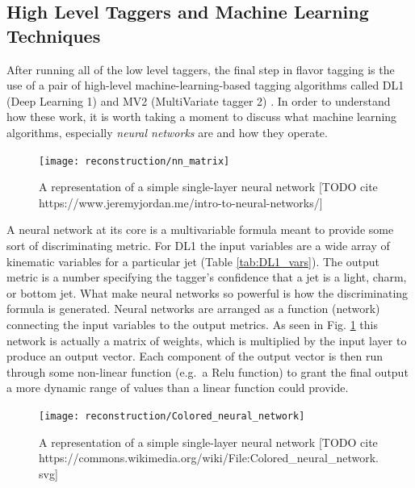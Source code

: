         \FloatBarrier
        \subsection{High Level Taggers and Machine Learning Techniques}\label{sec:ml_techniques}

            After running all of the low level taggers,
                the final step in flavor tagging is the use of a pair of high-level machine-learning-based tagging algorithms
                called DL1 (Deep Learning 1) and MV2 (MultiVariate tagger 2)
                \cite{bjet_id_and_performance} \cite{btagging_optimisation}.
            In order to understand how these work, it is worth taking a moment to discuss what machine learning algorithms,
                especially \textit{neural networks} are and how they operate.

            \begin{figure}[tbh] \center
                \texttt{[image: reconstruction/nn\_matrix]}
                \caption{
                    A representation of a simple single-layer neural network
                    [TODO cite https://www.jeremyjordan.me/intro-to-neural-networks/]
                }
                \label{fig:nn_matrix}
            \end{figure}

            A neural network at its core is a multivariable formula meant to provide some sort of discriminating metric\cite{MLatLHC}.
            For DL1 the input variables are a wide array of kinematic variables for a particular jet (Table \ref{tab:DL1_vars}).
            The output metric is a number specifying the tagger's confidence that a jet is
                a light, charm, or bottom jet.
            What make neural networks so powerful is how the discriminating formula is generated.
            Neural networks are arranged as a function (network) connecting the input variables to the output metrics. 
            As seen in Fig. \ref{fig:nn_matrix} this network is actually a matrix of weights,
                which is multiplied by the input layer to produce an output vector.
            Each component of the output vector is then run through some non-linear function (e.g.\ a Relu function)
                to grant the final output a more dynamic range of values than a linear function could provide.

            \begin{figure}[tbh] \center
                \texttt{[image: reconstruction/Colored\_neural\_network]}
                \caption{
                    A representation of a simple single-layer neural network
                    [TODO cite https://commons.wikimedia.org/wiki/File:Colored\_neural\_network.svg]
                }
                \label{fig:colored_neural_network}
            \end{figure}

